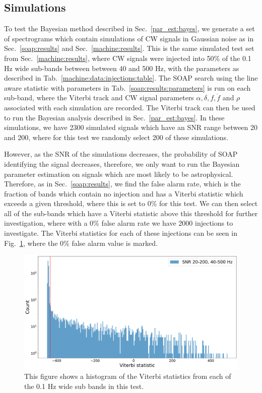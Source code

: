 \subsection{\label{par_est:results:simulations}Simulations}
%
%
To test the Bayesian method described in Sec.~\ref{par_est:bayes}, we generate a
set of spectrograms which contain simulations of \gls{CW} signals in Gaussian noise as in Sec.~\ref{soap:results} and
Sec.~\ref{machine:results}.  This is the same simulated test set from
Sec.~\ref{machine:results}, where \gls{CW} signals were injected into 50\% of
the 0.1 Hz wide sub-bands between between 40 and 500 Hz, with the parameters as
described in Tab.~\ref{machine:data:injections:table}.  The SOAP search using
the line aware statistic with parameters in Tab.~\ref{soap:results:parameters}
is run on each sub-band, where the Viterbi track and \gls{CW} signal parameters
$\alpha, \delta, f, \dot{f}$ and $\rho$ associated with each
simulation are recorded.  The Viterbi track can then be used to run the
Bayesian analysis described in Sec.~\ref{par_est:bayes}.  In these simulations,
we have 2300 simulated signals which have an \gls{SNR} range between 20 and
200, where for this test we randomly select 200 of these simulations.

\if
However, as the \gls{SNR} of the simulations decreases, the probability of SOAP identifying the signal decreases, therefore, we only want to run the Bayesian parameter estimation on signals which are most likely to be astrophysical.
Therefore, as in Sec.~\ref{soap:results}, we find the false alarm rate, which is the fraction of bands which contain no injection and has a Viterbi statistic which exceeds a given threshold, where this is set to 0\% for this test.
We can then select all of the sub-bands which have a Viterbi statistic above this threshold for further investigation, where with a 0\% false alarm rate we have 2000  injections to investigate.
The Viterbi statistics for each of these injections can be seen in Fig.~\ref{par_est:results:all_viterbi}, where the 0\% false alarm value is marked.
%
\begin{figure}
    \centering
    \includegraphics[width=\linewidth]{C5_parameter/viterbi_hist.pdf}
    \caption[All Viterbi statistics]{This figure shows a histogram of the Viterbi statistics from each of the 0.1 Hz wide sub bands in this test. }
    \label{par_est:results:all_viterbi}
\end{figure}
\fi


